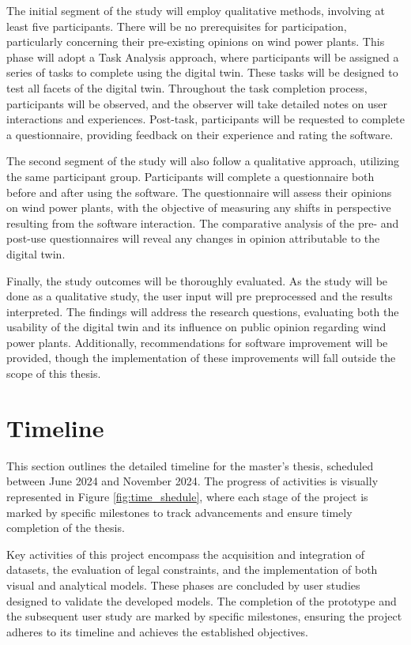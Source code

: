 \documentclass[11pt, titlepage, a4paper]{scrartcl}
\begin{document}
\begin{linenumbers}
    The initial segment of the study will employ qualitative methods, involving at least five participants. There will be no prerequisites for participation, particularly concerning their pre-existing opinions on wind power plants. This phase will adopt a Task Analysis approach, where participants will be assigned a series of tasks to complete using the digital twin. These tasks will be designed to test all facets of the digital twin. Throughout the task completion process, participants will be observed, and the observer will take detailed notes on user interactions and experiences. Post-task, participants will be requested to complete a questionnaire, providing feedback on their experience and rating the software.

    The second segment of the study will also follow a qualitative approach, utilizing the same participant group. Participants will complete a questionnaire both before and after using the software. The questionnaire will assess their opinions on wind power plants, with the objective of measuring any shifts in perspective resulting from the software interaction. The comparative analysis of the pre- and post-use questionnaires will reveal any changes in opinion attributable to the digital twin.

    Finally, the study outcomes will be thoroughly evaluated. As the study will be done as a qualitative study, the user input will pre preprocessed and the results interpreted. The findings will address the research questions, evaluating both the usability of the digital twin and its influence on public opinion regarding wind power plants. Additionally, recommendations for software improvement will be provided, though the implementation of these improvements will fall outside the scope of this thesis.


    \section{Timeline}
    This section outlines the detailed timeline for the master's thesis, scheduled between June 2024 and November 2024.
    The progress of activities is visually represented in Figure \ref{fig:time_shedule}, where each stage of the project is marked by specific milestones to track advancements and ensure timely completion of the thesis.


    Key activities of this project encompass the acquisition and integration of datasets, the evaluation of legal constraints, and the implementation of both visual and analytical models. These phases are concluded by user studies designed to validate the developed models. The completion of the prototype and the subsequent user study are marked by specific milestones, ensuring the project adheres to its timeline and achieves the established objectives.


\end{linenumbers}
\end{document}
